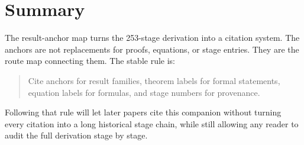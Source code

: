 \section{Summary}
\label{sec:anchor-map-summary}

The result-anchor map turns the 253-stage derivation into a citation system.  The anchors are not replacements for proofs, equations, or stage entries.  They are the route map connecting them.  The stable rule is:
\begin{quote}
Cite anchors for result families, theorem labels for formal statements, equation labels for formulas, and stage numbers for provenance.
\end{quote}
Following that rule will let later papers cite this companion without turning every citation into a long historical stage chain, while still allowing any reader to audit the full derivation stage by stage.
